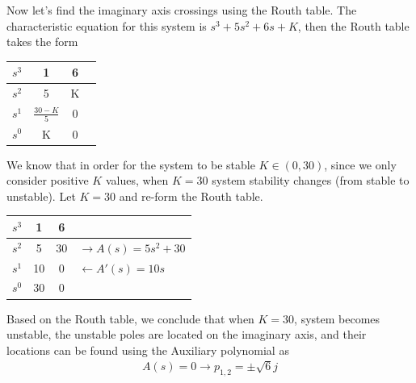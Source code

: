 \documentclass[twoside]{article}
\begin{document}
\begin{enumerate}
\vspace{12pt}

Now let's find the imaginary axis crossings using the Routh table. 
The characteristic equation for this system is $s^3 + 5 s^2 + 6 s +
K$, then the Routh table takes the form

\vspace{6pt}
\begin{minipage}[h]{1\linewidth}
\begin{center}
\begin{tabular}{|c || c || c | l |}
\hline
$s^3$ & 1 & 6 & 
\\ \hline
$s^2$ & 5 & K & 
\\ \hline
$s^1$ & $\frac{30 - K}{5}$ & 0 & 
\\ \hline
$s^0$ & K & 0 &
\\ \hline
\end{tabular}
\end{center}
\end{minipage}
\vspace{6pt}

We know that in order for the system to be stable $K \in (0 , 30)$,
since we only consider positive $K$ values, when $K = 30$
system stability changes (from stable to unstable). Let $K=30$
and re-form the Routh table. 

\vspace{6pt}
\begin{minipage}[h]{1\linewidth}
\begin{center}
\begin{tabular}{|c || c || c | l |}
\hline
$s^3$ & 1 & 6 & 
\\ \hline
$s^2$ & 5 & 30 & $\rightarrow A(s) = 5 s^2 + 30$
\\ \hline
$s^1$ & 10 & 0 &  $\leftarrow A'(s) = 10 s $
\\ \hline
$s^0$ & 30 & 0 &
\\ \hline
\end{tabular}
\end{center}
\end{minipage}
\vspace{6pt}

Based on the Routh table, we conclude that when $K = 30$, system
becomes unstable, the unstable poles are located on the imaginary
axis, and their locations can be found using the Auxiliary polynomial 
as
%
\begin{align*}
A(s) = 0 \rightarrow p_{1,2} = \pm \sqrt{6} j
\end{align*}
%


\end{enumerate}
\end{document}
